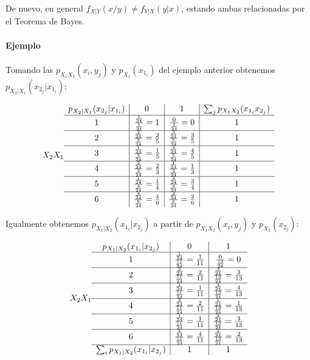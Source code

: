 \documentclass[11pt]{article}
\begin{document}
De nuevo, en general \(f_{X | Y}(x/y) \neq f_{Y | X}(y | x)\), estando
ambas relacionadas por el Teorema de Bayes.

    \hypertarget{ejemplo}{%
\paragraph{Ejemplo}\label{ejemplo}}

Tomando las \(p_{X_1X_2}(x_i,y_j)\) y \(p_{X_1}(x_{1_i})\) del ejemplo
anterior obtenemos \(p_{X_2 | X_1}(x_{2_j} | x_{1_i})\):

\[
X_2 \\X_1 \begin{array}{c|c|c|c}
p_{X_2 | X_1}(x_{2_j} | x_{1_i}) & 0 & 1 & \sum_j p_{X_1X_2}(x_{1_i}x_{2_j})\\
\hline
1 & \frac{\frac{1}{24}}{\frac{1}{24}}=1 & \frac{0}{\frac{1}{24}}=0 & 1\\
\hline
2 & \frac{\frac{2}{24}}{\frac{5}{24}}=\frac{2}{5} & \frac{\frac{3}{24}}{\frac{5}{24}}=\frac{3}{5} & 1\\
\hline
3 & \frac{\frac{1}{24}}{\frac{5}{24}}=\frac{1}{5} & \frac{\frac{4}{24}}{\frac{5}{24}}=\frac{4}{5} & 1\\
\hline
4 & \frac{\frac{2}{24}}{\frac{3}{24}}=\frac{2}{3} & \frac{\frac{1}{24}}{\frac{3}{24}}=\frac{1}{3} & 1\\
\hline
5 & \frac{\frac{1}{24}}{\frac{4}{24}}=\frac{1}{4} & \frac{\frac{3}{24}}{\frac{4}{24}}=\frac{3}{4} & 1\\
\hline
6 & \frac{\frac{4}{24}}{\frac{6}{24}}=\frac{4}{6} & \frac{\frac{2}{24}}{\frac{6}{24}}=\frac{2}{6} & 1\\
\end{array}
\]

    Igualmente obtenemos \(p_{X_1 | X_2}(x_{1_i} | x_{2_j})\) a partir de
\(p_{X_1X_2}(x_i,y_j)\) y \(p_{X_2}(x_{2_j})\):

\[
X_2 \\X_1 \begin{array}{c|c|c}
p_{X_1 | X_2}(x_{1_i} | x_{2_j}) & 0 & 1\\
\hline
1 & \frac{\frac{1}{24}}{\frac{11}{24}}=\frac{1}{11} & \frac{0}{\frac{13}{24}}=0\\
\hline
2 & \frac{\frac{2}{24}}{\frac{11}{24}}=\frac{2}{11} & \frac{\frac{3}{24}}{\frac{13}{24}}=\frac{3}{13}\\
\hline
3 & \frac{\frac{1}{24}}{\frac{11}{24}}=\frac{1}{11} & \frac{\frac{4}{24}}{\frac{13}{24}}=\frac{4}{13}\\
\hline
4 & \frac{\frac{2}{24}}{\frac{11}{24}}=\frac{2}{11} & \frac{\frac{1}{24}}{\frac{13}{24}}=\frac{1}{13}\\
\hline
5 & \frac{\frac{1}{24}}{\frac{11}{24}}=\frac{1}{11} & \frac{\frac{3}{24}}{\frac{13}{24}}=\frac{3}{13}\\
\hline
6 & \frac{\frac{4}{24}}{\frac{11}{24}}=\frac{4}{11} & \frac{\frac{2}{24}}{\frac{13}{24}}=\frac{2}{13}\\
\hline
\sum_i p_{X_1 | X_2}(x_{1_i} | x_{2_j}) & 1 & 1 
\end{array}
\]
\end{document}
